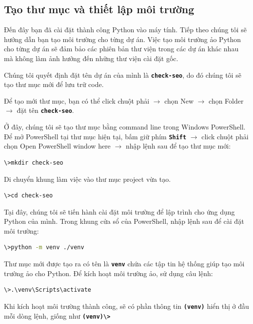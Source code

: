 \subsection{Tạo thư mục và thiết lập môi trường}
Đến đây bạn đã cài đặt thành công Python vào máy tính. Tiếp theo chúng tôi sẽ hướng dẫn bạn tạo môi trường cho từng dự án. Việc tạo môi trường ảo Python cho từng dự án sẽ đảm bảo các phiên bản thư viện trong các dự án khác nhau mà không làm ảnh hưởng đến những thư viện cài đặt gốc.
\par
Chúng tôi quyết định đặt tên dự án của mình là \textbf{\texttt{check-seo}}, do đó chúng tôi sẽ tạo thư mục mới để lưu trữ code.
\par
Để tạo mới thư mục, bạn có thể click chuột phải $\rightarrow$ chọn New $\rightarrow$ chọn Folder $\rightarrow$ đặt tên \textbf{\texttt{check-seo}}.
\par
Ở đây, chúng tôi sẽ tạo thư mục bằng command line trong Windows PowerShell. Để mở PowerShell tại thư mục hiện tại, bấm giữ phím \textbf{\texttt{Shift}} $\rightarrow$ click chuột phải chọn Open PowerShell window here $\rightarrow$ nhập lệnh sau để tạo thư mục mới:
\begin{lstlisting}[language=bash]
\>mkdir check-seo
\end{lstlisting}
\par
Di chuyển khung làm việc vào thư mục project vừa tạo.
\begin{lstlisting}[language=bash]
\>cd check-seo
\end{lstlisting}
\par
Tại đây, chúng tôi sẽ tiến hành cài đặt môi trường để lập trình cho ứng dụng Python của mình. Trong khung cửa sổ của PowerShell, nhập lệnh sau để cài đặt môi trường:
\begin{lstlisting}[language=bash]
\>python -m venv ./venv
\end{lstlisting}
\par
Thư mục mới được tạo ra có tên là \textbf{\texttt{venv}} chứa các tập tin hệ thống giúp tạo môi trường ảo cho Python. Để kích hoạt môi trường ảo, sử dụng câu lệnh:
\begin{lstlisting}[language=bash]
\>.\venv\Scripts\activate
\end{lstlisting}
\par
Khi kích hoạt môi trường thành công, sẽ có phần thông tin \textbf{\texttt{(venv)}} hiển thị ở đầu mỗi dòng lệnh, giống như \textbf{\texttt{(venv)\textbackslash>}}
